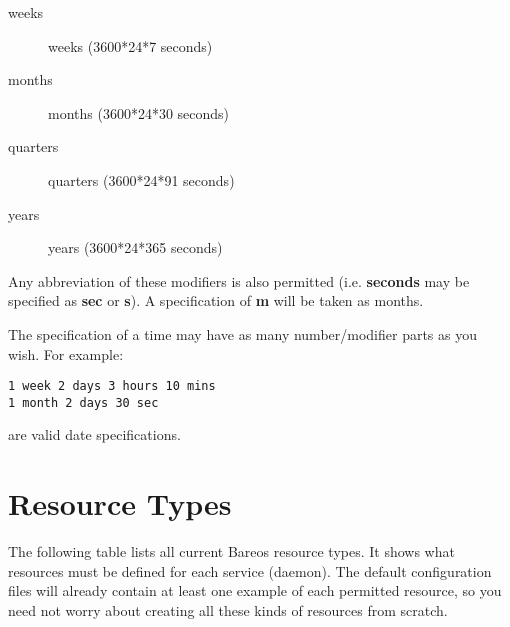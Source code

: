 \begin{description}
\begin{description}
\item [weeks]
   weeks (3600*24*7 seconds)

\item [months]
   months (3600*24*30 seconds)

\item [quarters]
   quarters (3600*24*91 seconds)

\item [years]
   years (3600*24*365 seconds)
\end{description}

Any abbreviation of these modifiers is also permitted (i.e.  {\bf seconds}
may be specified as {\bf sec} or {\bf s}).  A specification of {\bf m} will
be taken as months.

The specification of a time may have as many number/modifier parts as you
wish.  For example:

\footnotesize
\begin{verbatim}
1 week 2 days 3 hours 10 mins
1 month 2 days 30 sec

\end{verbatim}
\normalsize

are valid date specifications.

\end{description}

\label{ResTypes}
\section{Resource Types}

The following table lists all current Bareos resource types. It shows what
resources must be defined for each service (daemon). The default configuration
files will already contain at least one example of each permitted resource, so
you need not worry about creating all these kinds of resources from scratch.

